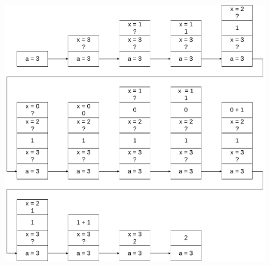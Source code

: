 \documentclass[a4paper,10pt]{jsarticle}
\begin{document}
\section{}
\begin{figure}[H]
  \centering
  \includegraphics[width=\linewidth]{01.png}
\end{figure}
\end{document}

